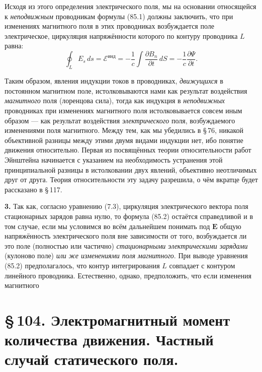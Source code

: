 \documentclass[a4paper,12pt]{article}
\begin{document}
Исходя из этого определения электрического поля, мы на основании
относящейся к \textit{неподвижным} проводникам формулы (85.1) должны
заключить, что при изменениях магнитного поля в этих проводниках
возбуждается поле электрическое, циркуляция напряжённости которого по
контуру проводника $L$ равна:
\begin{equation}
    \oint_L E_s\,ds = \mathcal{E}^{\text{инд}}
    = -\frac{1}{c}\int\frac{\partial B_n}{\partial t}\,dS
    = -\frac{1}{c}\frac{\partial\Psi}{\partial t}.
    \tag{85.2}
\end{equation}

Таким образом, явления индукции токов в проводниках, \textit{движущихся}
в постоянном магнитном поле, истолковываются нами как результат
воздействия \textit{магнитного} поля (лоренцова сила), тогда как
индукция в \textit{неподвижных} проводниках при изменениях магнитного
поля истолковывается совсем иным образом — как результат воздействия
\textit{электрического} поля, возбуждаемого изменениями поля магнитного.
Между тем, как мы убедились в §\,76, никакой объективной разницы между
этими двумя видами индукции нет, ибо понятие движения относительно.
Первая из посвящённых теории относительности работ Эйнштейна начинается
с указанием на необходимость устранения этой принципиальной разницы
в истолковании двух явлений, объективно неотличимых друг от друга.
Теория относительности эту задачу разрешила, о чём вкратце будет
рассказано в §\,117.

\textbf{3.} Так как, согласно уравнению (7.3), циркуляция электрического
вектора поля стационарных зарядов равна нулю, то формула (85.2) остаётся
справедливой и в том случае, если мы условимся во всём дальнейшем
понимать под $\mathbf{E}$ общую напряжённость электрического поля вне
зависимости от того, возбуждается ли это поле (полностью или частично)
\textit{стационарными электрическими зарядами} (кулоново поле) \textit{или
же изменениями поля магнитного}. При выводе уравнения (85.2) предполагалось,
что контур интегрирования $L$ совпадает с контуром линейного проводника.
Естественно, однако, предположить, что если изменения магнитного


\section*{\S\,104. Электромагнитный момент количества движения.
Частный случай статического поля.}
\end{document}
